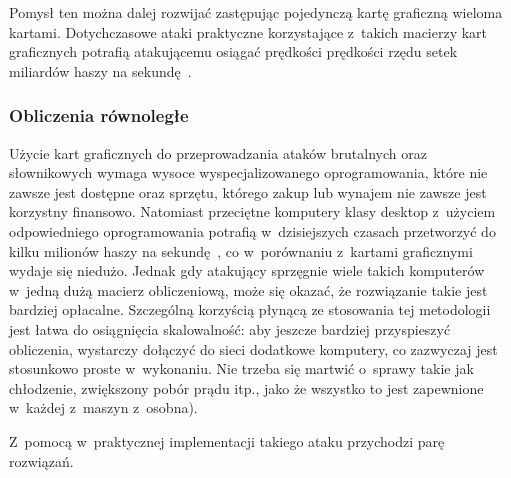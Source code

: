 Pomysł ten można dalej rozwijać zastępując pojedynczą kartę graficzną wieloma
kartami. Dotychczasowe ataki praktyczne korzystające z~takich macierzy kart
graficznych potrafią atakującemu osiągać prędkości prędkości rzędu setek
miliardów haszy na sekundę~\cite{gpu_cracking_parallel}.



\subsubsection{Obliczenia równoległe}

Użycie kart graficznych do przeprowadzania ataków brutalnych oraz słownikowych
wymaga wysoce wyspecjalizowanego oprogramowania, które nie zawsze jest dostępne
oraz sprzętu, którego zakup lub wynajem nie zawsze jest korzystny finansowo.
Natomiast przeciętne komputery klasy desktop z~użyciem odpowiedniego
oprogramowania potrafią w~dzisiejszych czasach przetworzyć do kilku milionów
haszy na sekundę~\cite{oclhashcat,john_the_ripper_benchmarks}, co w~porównaniu
z~kartami graficznymi wydaje się niedużo. Jednak gdy atakujący sprzęgnie wiele
takich komputerów w~jedną dużą macierz obliczeniową, może się okazać, że
rozwiązanie takie jest bardziej opłacalne. Szczególną korzyścią płynącą ze
stosowania tej metodologii jest łatwa do osiągnięcia skalowalność: aby jeszcze
bardziej przyspieszyć obliczenia, wystarczy dołączyć do sieci dodatkowe
komputery, co zazwyczaj jest stosunkowo proste w~wykonaniu. Nie trzeba się
martwić o~sprawy takie jak chłodzenie, zwiększony pobór prądu itp., jako że
wszystko to jest zapewnione w~każdej z~maszyn z~osobna).

Z~pomocą w~praktycznej implementacji takiego ataku przychodzi parę rozwiązań.

